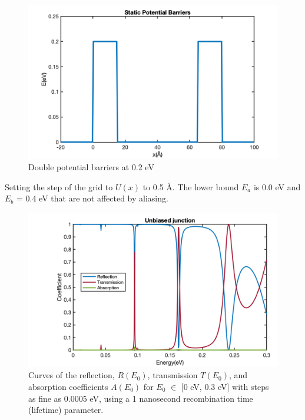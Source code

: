 \documentclass[twocolumn]{article}[ht]
\begin{document}
\begin{figure}[ht]
    \centering
    \includegraphics[width=0.9\linewidth]{Static_Potential_Barriers.png}
    \caption{Double potential barriers at 0.2 eV}
    \label{fig:example-1}
\end{figure}
Setting the step of the grid to $U(x)$ to 0.5 \AA. The lower bound $E_a$ is 0.0 eV and $E_b$ = 0.4 eV that are not affected by aliasing.

\begin{figure}[ht]
    \centering
    \hspace{-1cm}
    \includegraphics[width=0.9\linewidth]{unbiased_junction_spectra.png}
    \caption{Curves of the reflection, $R(E_0)$, transmission $T(E_0)$, and absorption coefficients $A(E_0)$ for $E_0$ $\in$ [0 eV, 0.3 eV] with steps as fine as 0.0005 eV, using a 1 nanosecond recombination time (lifetime) parameter.}
    \label{fig:example-2}
\end{figure}
\end{document}
